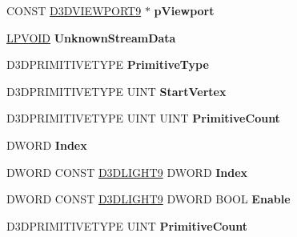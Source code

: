 \begin{DoxyCompactItemize}
C\+O\+N\+ST \hyperlink{struct___d3_d_v_i_e_w_p_o_r_t9}{D3\+D\+V\+I\+E\+W\+P\+O\+R\+T9} $\ast$ {\bfseries p\+Viewport}
\item 
\mbox{\label{struct___i_direct3_d_device9_vtbl___i_n_t_af9530525bc25fe51fb831d17e804b1d0}} 
\hyperlink{interfacevoid}{L\+P\+V\+O\+ID} {\bfseries Unknown\+Stream\+Data}
\item 
\mbox{\label{struct___i_direct3_d_device9_vtbl___i_n_t_a7054f773fa22bc6adb6da9c0acfb4370}} 
D3\+D\+P\+R\+I\+M\+I\+T\+I\+V\+E\+T\+Y\+PE {\bfseries Primitive\+Type}
\item 
\mbox{\label{struct___i_direct3_d_device9_vtbl___i_n_t_a22d5f8305902b9bbdeffdee691873e91}} 
D3\+D\+P\+R\+I\+M\+I\+T\+I\+V\+E\+T\+Y\+PE U\+I\+NT {\bfseries Start\+Vertex}
\item 
\mbox{\label{struct___i_direct3_d_device9_vtbl___i_n_t_acb465a2e9ac2a135b54210153be60aea}} 
D3\+D\+P\+R\+I\+M\+I\+T\+I\+V\+E\+T\+Y\+PE U\+I\+NT U\+I\+NT {\bfseries Primitive\+Count}
\item 
\mbox{\label{struct___i_direct3_d_device9_vtbl___i_n_t_a20528f04faa3b321e83fe0f57e663c77}} 
D\+W\+O\+RD {\bfseries Index}
\item 
\mbox{\label{struct___i_direct3_d_device9_vtbl___i_n_t_a08ad9f1f74b276327fd5ceb1ffaf6527}} 
D\+W\+O\+RD C\+O\+N\+ST \hyperlink{struct___d3_d_l_i_g_h_t9}{D3\+D\+L\+I\+G\+H\+T9} D\+W\+O\+RD {\bfseries Index}
\item 
\mbox{\label{struct___i_direct3_d_device9_vtbl___i_n_t_acbc12a7ef3483b42d1cdf4ed33384e3c}} 
D\+W\+O\+RD C\+O\+N\+ST \hyperlink{struct___d3_d_l_i_g_h_t9}{D3\+D\+L\+I\+G\+H\+T9} D\+W\+O\+RD B\+O\+OL {\bfseries Enable}
\item 
\mbox{\label{struct___i_direct3_d_device9_vtbl___i_n_t_a3c1095623c59b0a8baf78b48e989f366}} 
D3\+D\+P\+R\+I\+M\+I\+T\+I\+V\+E\+T\+Y\+PE U\+I\+NT {\bfseries Primitive\+Count}

\end{DoxyCompactItemize}
